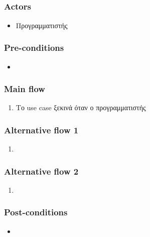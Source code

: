 \documentclass[../diploma_thesis.tex]{subfiles}
\begin{document}
\subsection{}
\subsubsection{Actors}
\begin{itemize}
\item  Προγραμματιστής
\end{itemize}
\subsubsection{Pre-conditions}
\begin{itemize}
\item  
\end{itemize}
\subsubsection{Main flow}
\begin{enumerate}
\item Το use case ξεκινά όταν ο προγραμματιστής 
\end{enumerate}
\subsubsection{Alternative flow 1}
\begin{enumerate}
\item 
\end{enumerate}
\subsubsection{Alternative flow 2}
\begin{enumerate}
\item 
\end{enumerate}
\subsubsection{Post-conditions}
\begin{itemize}
\item  
\end{itemize}
\end{document}
